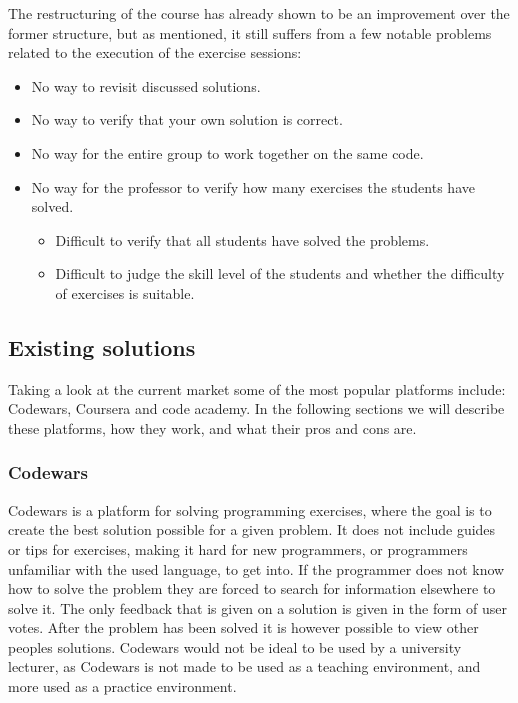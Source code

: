 The restructuring of the course has already shown to be an improvement over the former structure, but as mentioned, it still suffers from a few notable problems related to the execution of the exercise sessions:
\begin{itemize}
	\item No way to revisit discussed solutions.
	\item No way to verify that your own solution is correct.
	\item No way for the entire group to work together on the same code.
	\item No way for the professor to verify how many exercises the students have solved.
	\begin{itemize}
		\item Difficult to verify that all students have solved the problems.
		\item Difficult to judge the skill level of the students and whether the difficulty of exercises is suitable.
	\end{itemize}
\end{itemize}

\subsection{Existing solutions}
Taking a look at the current market some of the most popular platforms include: Codewars, Coursera and code academy.
In the following sections we will describe these platforms, how they work, and what their pros and cons are.

\subsubsection*{Codewars}
Codewars is a platform for solving programming exercises, where the goal is to create the best solution possible for a given problem. It does not include guides or tips for exercises, making it hard for new programmers, or programmers unfamiliar with the used language, to get into. If the programmer does not know how to solve the problem they are forced to search for information elsewhere to solve it. The only feedback that is given on a solution is given in the form of user votes. After the problem has been solved it is however possible to view other peoples solutions\cite{Codewars}. 
Codewars would not be ideal to be used by a university lecturer, as Codewars is not made to be used as a teaching environment, and more used as a practice environment.

